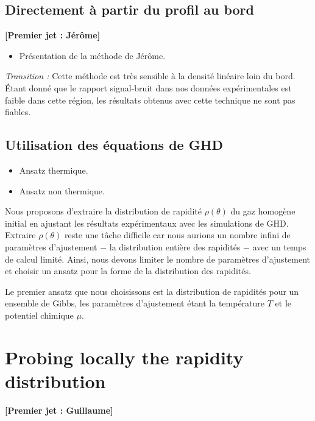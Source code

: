 \documentclass[submission, Phys]{SciPost}
\begin{document}
{\subsection*{Directement à partir du profil au bord}
{\bf [Premier jet : Jérôme]}\\
\begin{itemize}
    \item Présentation de la méthode de Jérôme.
\end{itemize}

\textit{Transition :} Cette méthode est très sensible à la densité linéaire loin du bord. Étant donné que le rapport signal-bruit dans nos données expérimentales est faible dans cette région, les résultats obtenus avec cette technique ne sont pas fiables.

\subsection*{Utilisation des équations de GHD}

\begin{itemize}
    \item Ansatz thermique.
    \item Ansatz non thermique.
\end{itemize}

Nous proposons d'extraire la distribution de rapidité $\rho (\theta)$ du gaz homogène initial en ajustant les résultats expérimentaux avec les simulations de GHD. 
Extraire $\rho (\theta)$ reste une tâche difficile car nous aurions un nombre infini de paramètres d'ajustement $-$ la distribution entière des rapidités $-$ avec un temps de calcul limité.
Ainsi, nous devons limiter le nombre de paramètres d'ajustement et choisir un ansatz pour la forme de la distribution des rapidités.

Le premier ansatz que nous choisissons est la distribution de rapidités pour un ensemble de Gibbs, les paramètres d'ajustement étant la température $T$ et le potentiel chimique $\mu$.

}

\section{Probing locally the rapidity distribution}
{\bf [Premier jet : Guillaume]}
\label{sec:local}
\end{document}

